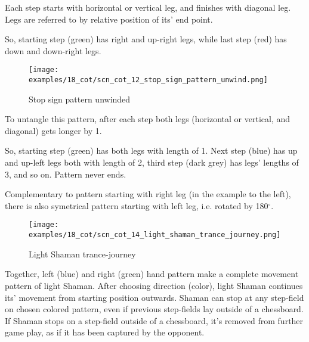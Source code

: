 Each step starts with horizontal or vertical leg, and finishes with diagonal
leg. Legs are referred to by relative position of its' end point.

So, starting step (green) has right and up-right legs, while last step (red)
has down and down-right legs.

\clearpage %

\noindent
\begin{wrapfigure}{l}{0.4\textwidth} %
\centering
\texttt{[image: examples/18\_cot/scn\_cot\_12\_stop\_sign\_pattern\_unwind.png]}
\caption{Stop sign pattern unwinded}
\label{fig:scn_cot_12_stop_sign_pattern_unwind}
\end{wrapfigure}
To untangle this pattern, after each step both legs (horizontal or vertical,
and diagonal) gets longer by 1.

So, starting step (green) has both legs with length of 1. Next step (blue)
has up and up-left legs both with length of 2, third step (dark grey) has
legs' lengths of 3, and so on. Pattern never ends.

Complementary to pattern starting with right leg (in the example to the
left), there is also symetrical pattern starting with left leg, i.e.
rotated by 180$^{\circ}$. %

\clearpage %

\noindent
\begin{figure}[!h]
\texttt{[image: examples/18\_cot/scn\_cot\_14\_light\_shaman\_trance\_journey.png]}
\caption{Light Shaman trance-journey}
\label{fig:scn_cot_14_light_shaman_trance_journey}
\end{figure}

Together, left (blue) and right (green) hand pattern make a complete movement
pattern of light Shaman. After choosing direction (color), light Shaman
continues its' movement from starting position outwards. Shaman can stop at
any step-field on chosen colored pattern, even if previous step-fields lay
outside of a chessboard. If Shaman stops on a step-field outside of a
chessboard, it's removed from further game play, as if it has been captured
by the opponent.

\clearpage %

